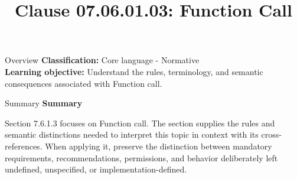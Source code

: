 \documentclass[10pt,letterpaper]{article}
\title{Clause 07.06.01.03: Function Call}
\author{}
\date{}
\begin{document}
\maketitle
\begin{CornellOverviewBox}{Overview}
\textbf{Classification:} Core language - Normative\\[2pt]
\textbf{Learning objective:} Understand the rules, terminology, and semantic consequences associated with Function call.
\end{CornellOverviewBox}\begin{CornellSummaryBox}{Summary}
{\sffamily\bfseries\color{Accent} Summary}\par\vspace{3pt}Section 7.6.1.3 focuses on Function call. The section supplies the rules and semantic distinctions needed to interpret this topic in context with its cross-references. When applying it, preserve the distinction between mandatory requirements, recommendations, permissions, and behavior deliberately left undefined, unspecified, or implementation-defined.
\end{CornellSummaryBox}
\end{document}
